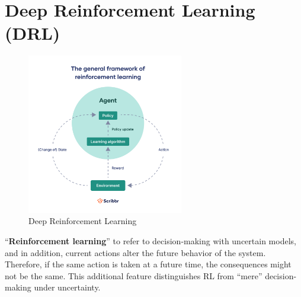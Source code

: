 \chapter{Deep Reinforcement Learning (DRL)}\label{Deep Reinforcement Learning}

\begin{table}[H]
    \begin{minipage}{0.45\linewidth}
        \begin{figure}[H]
            \centering
            \includegraphics[height=7cm]{Pictures/deep-reinforcement-learning/drl-flow.jpg}
            \caption{Deep Reinforcement Learning}
        \end{figure}        
    \end{minipage}
    \hfill
    \begin{minipage}{0.45\linewidth}
        “\textbf{Reinforcement learning}” to refer to decision-making with uncertain models, and in addition, current actions alter the future behavior of the system. Therefore, if the same action is taken at a future time, the consequences might not be the same. This additional feature distinguishes RL from “mere” decision-making under uncertainty.\cite{arxiv-2304.00803}
    \end{minipage}
\end{table}


